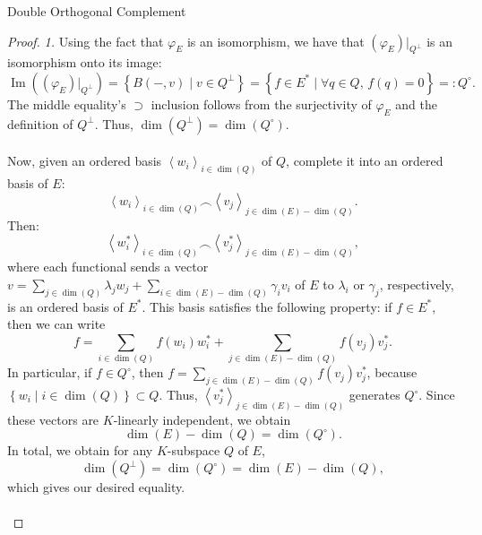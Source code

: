 \begin{appendixitem}{Double Orthogonal Complement}
    \begin{proof}
        \textit{1.} Using the fact that \( \varphi_E \) is an isomorphism, we have that \( \left(\varphi_E\right)|_{Q^{\perp}} \) is an isomorphism onto its image:
        \[
            \operatorname{Im}\left(\left(\varphi_E\right)|_{Q^{\perp}}\right) = \left\{ B\left(-, v\right) \mid v \in Q^{\perp} \right\} = \left\{ f \in E^{*} \mid \forall q \in Q, \, f\left(q\right) = 0 \right\} =: Q^{\circ}.
        \]
        The middle equality's \( \supset \) inclusion follows from the surjectivity of \( \varphi_E \) and the definition of \( Q^{\perp} \). Thus, \( \dim\left(Q^{\perp}\right) = \dim\left(Q^{\circ}\right) \).
        \\\\
        Now, given an ordered basis \( \left\langle w_i\right\rangle_{i \in \dim\left(Q\right)} \) of \( Q \), complete it into an ordered basis of \( E \):
        \[
            \left\langle w_i\right\rangle_{i \in \dim\left(Q\right)} \frown \left\langle v_j\right\rangle_{j \in \dim\left(E\right) - \dim\left(Q\right)}.
        \]
        Then:
        \[
            \left\langle w_i^*\right\rangle_{i \in \dim\left(Q\right)} \frown \left\langle v_j^*\right\rangle_{j \in \dim\left(E\right) - \dim\left(Q\right)},
        \]
        where each functional sends a vector \( v = \sum_{j \in \dim\left(Q\right)} \lambda_j w_j + \sum_{i \in \dim\left(E\right) - \dim\left(Q\right)} \gamma_i v_i \) of \( E \) to \( \lambda_i \) or \( \gamma_j \), respectively, is an ordered basis of \( E^{*} \). This basis satisfies the following property: if \( f \in E^{*} \), then we can write
        \[
            f = \sum_{i \in \dim\left(Q\right)} f\left(w_i\right) w_i^* + \sum_{j \in \dim\left(E\right) - \dim\left(Q\right)} f\left(v_j\right) v_j^*.
        \]
        In particular, if \( f \in Q^{\circ} \), then \( f = \sum_{j \in \dim\left(E\right) - \dim\left(Q\right)} f\left(v_j\right) v_j^* \), because \( \left\{w_i \mid i \in \dim\left(Q\right)\right\} \subset Q \). Thus, \( \left\langle v_j^*\right\rangle_{j \in \dim\left(E\right) - \dim\left(Q\right)} \) generates \( Q^{\circ} \). Since these vectors are \( K \)-linearly independent, we obtain
        \[
            \dim\left(E\right) - \dim\left(Q\right) = \dim\left(Q^{\circ}\right).
        \]
        In total, we obtain for any \( K \)-subspace \( Q \) of \( E \),
        \[
            \dim\left(Q^{\perp}\right) = \dim\left(Q^{\circ}\right) = \dim\left(E\right) - \dim\left(Q\right),
        \]
        which gives our desired equality.
        \\\\

\end{proof}
\end{appendixitem}
